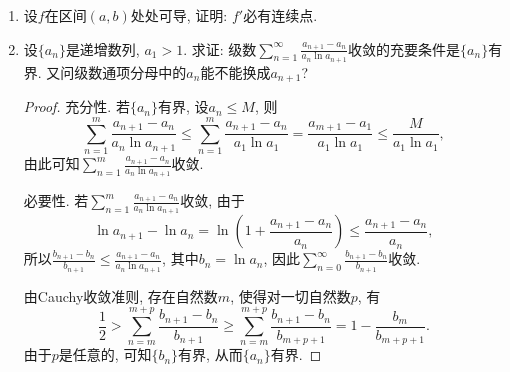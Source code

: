 \begin{quizb}
\begin{enumerate}
\begin{proof}
\begin{enumerate}[label=(\roman*)]
换种表述就是：存在以有理数为端点的区间$(p,q)$满足$\boldsymbol{x}\in f^{-1}(p,q)$，
使得$\boldsymbol{x}$不是$f^{-1}(p,q)$的内点。
\item 显然。
\item 闭集\[F_{p,q,m,k}=\bigcap_{j=k}^{\infty}\left\lbrace\boldsymbol{x}\in\mathbb{R}^n\big| p+\frac{1}{m}\leqslant f_j(\boldsymbol{x})\leqslant q-\frac{1}{m}\right\rbrace\]
的内点当然也是$f^{-1}(p,q)$的内点，从而$F_{p,q,m,k}\setminus(f^{-1}(p,q))^\circ$无内点，是无处稠密集。
\item (iii)结合Baire纲定理可知$F$不是整个$\R^n$。\qedhere
\end{enumerate}
\end{proof}
\item 设\(f\)在区间\((a,b)\)处处可导, 证明: \(f'\)必有连续点.
\item 设\(\{a_n\}\)是递增数列, \(a_1>1\). 求证: 级数\(\sum_{n=1}^{\infty}\frac{a_{n+1}-a_n}{a_n\ln a_{n+1}}\)收敛的充要条件是\(\{a_n\}\)有界. 
又问级数通项分母中的\(a_n\)能不能换成\(a_{n+1}\)?
\begin{proof}
充分性. 若\(\{a_n\}\)有界, 设\(a_n\leqslant M\), 则
\[\sum_{n=1}^{m}\frac{a_{n+1}-a_n}{a_n\ln a_{n+1}}\leqslant\sum_{n=1}^{m}\frac{a_{n+1}-a_n}{a_1\ln a_1}=\frac{a_{m+1}-a_1}{a_1\ln a_1}\leqslant\frac{M}{a_1\ln a_1},\]
由此可知\(\sum_{n=1}^{m}\frac{a_{n+1}-a_n}{a_n\ln a_{n+1}}\)收敛.

必要性. 若\(\sum_{n=1}^{m}\frac{a_{n+1}-a_n}{a_n\ln a_{n+1}}\)收敛, 由于
\[\ln a_{n+1}-\ln a_n=\ln\left(1+\frac{a_{n+1}-a_n}{a_n}\right)\leqslant\frac{a_{n+1}-a_n}{a_n},\]
所以\(\frac{b_{n+1}-b_n}{b_{n+1}}\leqslant\frac{a_{n+1}-a_{n}}{a_n\ln a_{n+1}}\), 其中\(b_n=\ln a_n\), 因此\(\sum_{n=0}^{\infty}\frac{b_{n+1}-b_n}{b_{n+1}}\)收敛.

由Cauchy收敛准则, 存在自然数\(m\), 使得对一切自然数\(p\), 有
\[\frac{1}{2}>\sum_{n=m}^{m+p}\frac{b_{n+1}-b_n}{b_{n+1}}
\geqslant\sum_{n=m}^{m+p}\frac{b_{n+1}-b_n}{b_{m+p+1}}=1-\frac{b_m}{b_{m+p+1}}.\]
由于\(p\)是任意的, 可知\(\{b_n\}\)有界, 从而\(\{a_n\}\)有界.


\end{proof}
\end{enumerate}
\end{quizb}
